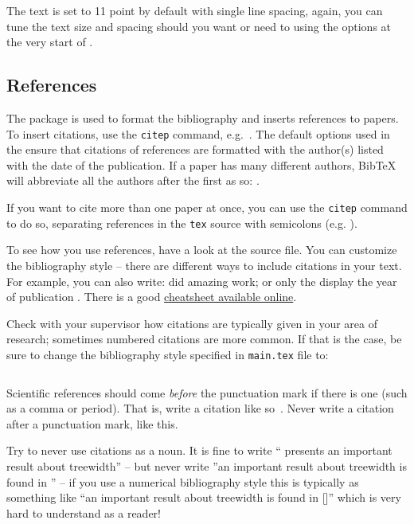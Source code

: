 The text is set to 11 point by default with single line spacing, again,
you can tune the text size and spacing should you want or need to using
the options at the very start of .

\subsection{References}

The  package is used to format the bibliography and
inserts references to papers. To insert citations, use the
\texttt{citep} command, e.g.~\citep{bodlaender:treewidth}. The default
options used in the  ensure that citations of references
are formatted with the author(s) listed with the date of the
publication. If a paper has many different authors, BibTeX will
abbreviate all the authors after the first as so: \citep{chakravarty:data-parallel-haskell}.

If you want to cite more than one paper at once, you can use the
\texttt{citep} command to do so, separating references in the
\texttt{tex} source with semicolons (e.g. \citep{bodlaender:treewidth,
  chakravarty:data-parallel-haskell}).

To see how you use references, have a look at the 
source file. You can customize the bibliography style -- there are
different ways to include citations in your text. For example, you can
also write: \citet{bodlaender:treewidth} did amazing work; or only the
display the year of publication \citeyear{bodlaender:treewidth}. There
is a good
\href{https://gking.harvard.edu/sites/g/files/omnuum7116/files/gking/files/natnotes2.pdf}{
  cheatsheet available online}.

Check with your supervisor how citations are typically given in your
area of research; sometimes numbered citations are more common. If that
is the case, be sure to change the bibliography style specified in
\texttt{main.tex} file to:
\begin{verbatim}

\end{verbatim}

Scientific references should come \emph{before} the punctuation mark if
there is one (such as a comma or period). That is, write a citation like
so~\citep{bodlaender:treewidth}. Never write a citation after a punctuation mark, like this.\citep{bodlaender:treewidth}

Try to never use citations as a noun. It is fine to write
``\citet{bodlaender:treewidth} presents an important result about
treewidth'' -- but never write ''an important result about treewidth is
found in \citep{bodlaender:treewidth}'' -- if you use a numerical
bibliography style this is typically as something like ``an important
result about treewidth is found in []''
which is very hard to understand as a reader!

